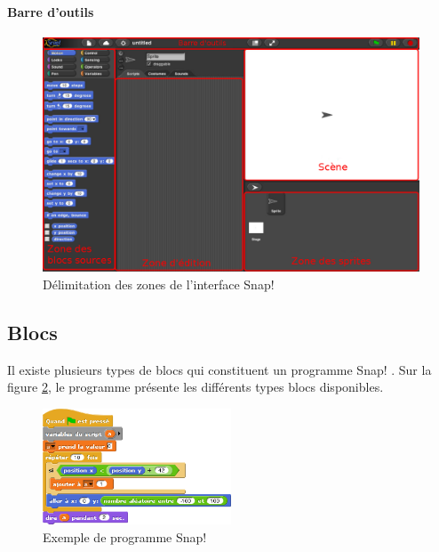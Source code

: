 \paragraph{Barre d'outils} 

\begin{figure}
  \begin{center}
  \includegraphics[width=\textwidth]{content/7-solution/2-snap/images/interface}
        \caption{Délimitation des zones de l'interface Snap!}
    \label{fig:snap interface}
  \end{center}
\end{figure}

\subsection{Blocs}
Il existe plusieurs types de blocs qui constituent un programme Snap! \cite{snap-man}. Sur la figure \ref{fig:software-used-script}, le programme présente les différents types blocs disponibles.
\begin{figure}
  \begin{center}
    \includegraphics[width=0.5\textwidth]{content/5-related_work/images/script}
    \caption{Exemple de programme Snap!}
    \label{fig:software-used-script}
  \end{center}
\end{figure}

